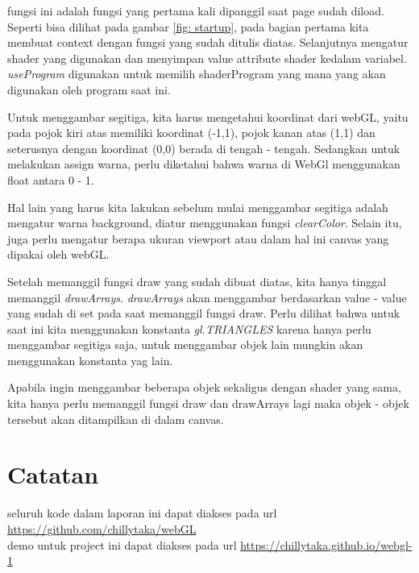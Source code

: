 fungsi ini adalah fungsi yang pertama kali dipanggil saat page sudah diload. Seperti bisa dilihat pada gambar \ref{fig: startup},
pada bagian pertama kita membuat context dengan fungsi yang sudah ditulis diatas. Selanjutnya mengatur shader yang digunakan
dan menyimpan value attribute shader kedalam variabel. \emph{useProgram} digunakan untuk memilih shaderProgram yang mana yang akan
digunakan oleh program saat ini.

Untuk menggambar segitiga, kita harus mengetahui koordinat dari webGL, yaitu pada pojok kiri atas memiliki koordinat (-1,1),
pojok kanan atas (1,1) dan seterusnya dengan koordinat (0,0) berada di tengah - tengah. Sedangkan untuk melakukan assign warna,
perlu diketahui bahwa warna di WebGl menggunakan float antara 0 - 1.

Hal lain yang harus kita lakukan sebelum mulai menggambar segitiga adalah mengatur warna background, diatur menggunakan fungsi
\emph{clearColor}. Selain itu, juga perlu mengatur berapa ukuran viewport atau dalam hal ini canvas yang dipakai oleh webGL.

Setelah memanggil fungsi draw yang sudah dibuat diatas, kita hanya tinggal memanggil \emph{drawArrays}. \emph{drawArrays} akan
menggambar berdasarkan value - value yang sudah di set pada saat memanggil fungsi draw. Perlu dilihat bahwa untuk saat ini kita
menggunakan konstanta \emph{gl.TRIANGLES} karena hanya perlu menggambar segitiga saja, untuk menggambar objek lain mungkin akan
menggunakan konstanta yag lain.

Apabila ingin menggambar beberapa objek sekaligus dengan shader yang sama, kita hanya perlu memanggil fungsi draw dan drawArrays lagi
maka  objek - objek tersebut akan ditampilkan di dalam canvas.

\section*{Catatan}
seluruh kode dalam laporan ini dapat diakses pada url \url{https://github.com/chillytaka/webGL} \\
demo untuk project ini dapat diakses pada url \url{https://chillytaka.github.io/webgl-1}



